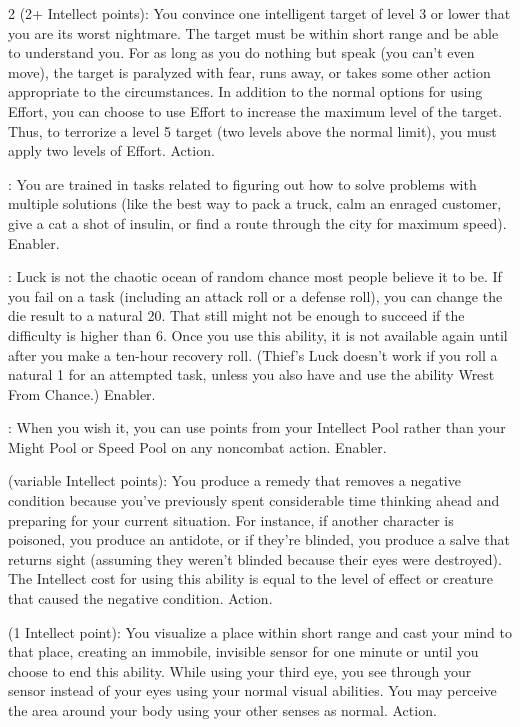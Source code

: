 \begin{multicols}{2}
 (2+ Intellect points): You convince one intelligent target of level 3 or lower that you are its worst nightmare. The target must be within short range and be able to understand you. For as long as you do nothing but speak (you can’t even move), the target is paralyzed with fear, runs away, or takes some other action appropriate to the circumstances. In addition to the normal options for using Effort, you can choose to use Effort to increase the maximum level of the target. Thus, to terrorize a level 5 target (two levels above the normal limit), you must apply two levels of Effort. Action. 
 
: You are trained in tasks related to figuring out how to solve problems with multiple solutions (like the best way to pack a truck, calm an enraged customer, give a cat a shot of insulin, or find a route through the city for maximum speed). Enabler. 
 
: Luck is not the chaotic ocean of random chance most people believe it to be. If you fail on a task (including an attack roll or a defense roll), you can change the die result to a natural 20. That still might not be enough to succeed if the difficulty is higher than 6. Once you use this ability, it is not available again until after you make a ten-hour recovery roll. (Thief’s Luck doesn’t work if you roll a natural 1 for an attempted task, unless you also have and use the ability Wrest From Chance.) Enabler.
 
: When you wish it, you can use points from your Intellect Pool rather than your Might Pool or Speed Pool on any noncombat action. Enabler. 
 
 (variable Intellect points): You produce a remedy that removes a negative condition because you’ve previously spent considerable time thinking ahead and preparing for your current situation. For instance, if another character is poisoned, you produce an antidote, or if they’re blinded, you produce a salve that returns sight (assuming they weren’t blinded because their eyes were destroyed). The Intellect cost for using this ability is equal to the level of effect or creature that caused the negative condition. Action. 
 
 (1 Intellect point): You visualize a place within short range and cast your mind to that place, creating an immobile, invisible sensor for one minute or until you choose to end this ability. While using your third eye, you see through your sensor instead of your eyes using your normal visual abilities. You may perceive the area around your body using your other senses as normal. Action. 
 

\end{multicols}
